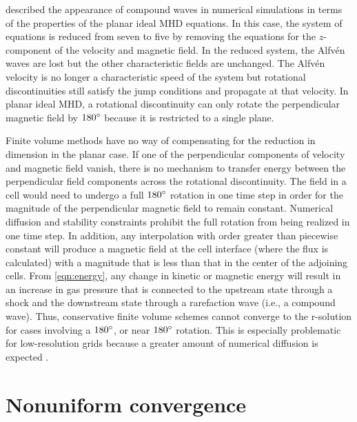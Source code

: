 \citet{Falle:2001} described the appearance of compound waves in numerical simulations in terms of the properties of the planar ideal MHD equations.  In this case, the system of equations is reduced from seven to five by removing the equations for the $z$-component of the velocity and magnetic field.  In the reduced system, the Alfv{\'e}n waves are lost but the other characteristic fields are unchanged.  The Alfv{\'e}n velocity is no longer a characteristic speed of the system but rotational discontinuities still satisfy the jump conditions and propagate at that velocity. In planar ideal MHD, a rotational discontinuity can only rotate the perpendicular magnetic field by $180^\circ$ because it is restricted to a single plane.     

Finite volume methods have no way of compensating for the reduction in dimension in the planar case.  If one of the perpendicular components of velocity and magnetic field vanish, there is no mechanism to transfer energy between the perpendicular field components across the rotational discontinuity.  The field in a cell would need to undergo a full $180^\circ$ rotation in one time step in order for the magnitude of the perpendicular magnetic field to remain constant.  Numerical diffusion and stability constraints prohibit the full rotation from being realized in one time step.  In addition, any interpolation with order greater than piecewise constant will produce a magnetic field at the cell interface (where the flux is calculated) with a magnitude that is less than that in the center of the adjoining cells.  From \eqref{eqn:energy}, any change in kinetic or magnetic energy will result in an increase in gas pressure that is connected to the upstream state through a shock and the downstream state through a rarefaction wave (i.e., a compound wave).  Thus, conservative finite volume schemes cannot converge to the r-solution for cases involving a $180^\circ$, or near $180^\circ$ rotation.  This is especially problematic for low-resolution grids because a greater amount of numerical diffusion is expected \citep{Barmin:1996,Torrilhon:2003b}.  

\section[Nonuniform convergence]{Nonuniform convergence}
\label{sec:nonuniform_converge}

